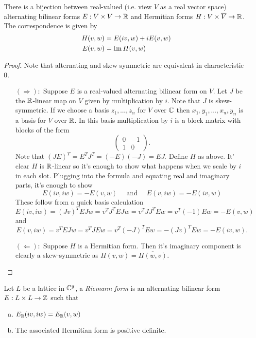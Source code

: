 \documentclass[11pt]{article}
\begin{document}
\begin{lem}
	There is a bijection between real-valued (i.e. view $V$ as a real vector space) alternating bilinear forms $E:V\times V \to \mathbb{R}$ and Hermitian forms $H:V\times\overline{V} \to \mathbb{R}$. The correspondence is given by
	\begin{align*}
		H(v,w) &= E(iv,w) + iE(v,w)
		\\
		E(v,w) &= \operatorname{Im} H(v,w)
	\end{align*}
\end{lem}
\begin{proof}
	Note that alternating and skew-symmetric are equivalent in characteristic $0$.
	\begin{enumerate}
		\item[$(\Rightarrow):$] Suppose $E$ is a real-valued alternating bilinear form on $V$. Let $J$ be the $\mathbb{R}$-linear map on $V$ given by multiplication by $i$. Note that $J$ is skew-symmetric. If we choose a basis $z_1,\dots,z_n$ for $V$ over $\mathbb{C}$ then $x_1,y_1,\dots,x_n,y_n$ is a basis for $V$ over $\mathbb{R}$. In this basis multiplication by $i$ is a block matrix with blocks of the form
		$$
		\begin{pmatrix}
			0 & -1
			\\
			1 & 0
		\end{pmatrix}.
		$$
		Note that $(JE)^T = E^TJ^T = (-E)(-J) = EJ$. Define $H$ as above. It' clear $H$ is $\mathbb{R}$-linear so it's enough to show what happens when we scale by $i$ in each slot. Plugging into the formula and equating real and imaginary parts, it's enough to show
		$$
		E(iv,iw) = -E(v,w)
		\quad\text{ and }\quad
		E(v,iw) = -E(iv,w)
		$$
		These follow from a quick basis calculation
		$$
		E(iv,iw) = (Jv)^TEJw = v^TJ^TEJw = v^TJJ^TEw = v^T(-1)Ew = -E(v,w)
		$$
		and
		$$
		E(v,iw) = v^TEJw = v^TJEw = v^T(-J)^TEw = -(Jv)^TEw = -E(iv,w).
		$$
		
		\item[$(\Leftarrow):$] Suppose $H$ is a Hermitian form. Then it's imaginary component is clearly a skew-symmetric as $H(v,w) = \overline{H(w,v)}$.
	\end{enumerate}
\end{proof}

\begin{defn}
	Let $L$ be a lattice in $\mathbb{C}^g$, a \emph{Riemann form} is an alternating bilinear form $E:L \times L \to \mathbb{Z}$ such that
	\begin{enumerate}[(a)]
		\item $E_{\mathbb{R}}(iv,iw) = E_{\mathbb{R}}(v,w)$
		\item The associated Hermitian form is positive definite.
	\end{enumerate}
\end{defn}
\end{document}
